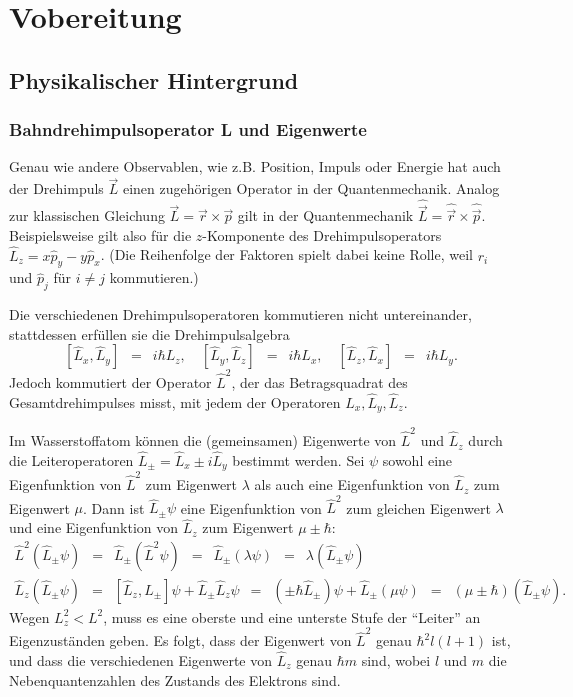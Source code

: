 \documentclass{article}
\newcommand{\widespace}{\enspace}
\newcommand{\wideeq}{\widespace = \widespace}
\begin{document}
\newpage


\section{Vobereitung}

\subsection{Physikalischer Hintergrund}

\subsubsection{Bahndrehimpulsoperator L und Eigenwerte}

Genau wie andere Observablen, wie z.B. Position, Impuls oder Energie hat auch der
Drehimpuls $\vec L$ einen zugehörigen Operator in der Quantenmechanik.
Analog zur klassischen Gleichung $\vec L = \vec r \times \vec p$
gilt in der Quantenmechanik $\hat{\vec L} = \hat{\vec r} \times \hat{\vec p}$.
Beispielsweise gilt also für die $z$-Komponente des Drehimpulsoperators
$\hat L_z = x \hat p_y - y \hat p_x$.
(Die Reihenfolge der Faktoren spielt dabei keine Rolle,
weil $r_i$ und $\hat p_j$ für $i \neq j$ kommutieren.)

Die verschiedenen Drehimpulsoperatoren kommutieren nicht untereinander,
stattdessen erfüllen sie die Drehimpulsalgebra
\[
    [\hat L_x, \hat L_y] \wideeq i \hbar L_z, \quad
    [\hat L_y, \hat L_z] \wideeq i \hbar L_x, \quad
    [\hat L_z, \hat L_x] \wideeq i \hbar L_y.
\]
Jedoch kommutiert der Operator $\hat L^2$, der das Betragsquadrat des
Gesamtdrehimpulses misst, mit jedem der Operatoren $\hat L_x, \hat L_y, \hat L_z$.

Im Wasserstoffatom können die (gemeinsamen) Eigenwerte von $\hat L^2$ und $\hat L_z$
durch die Leiteroperatoren $\hat L_{\pm} = \hat L_x \pm i \hat L_y$ bestimmt
werden. Sei $\psi$ sowohl eine Eigenfunktion von $\hat L^2$ zum Eigenwert $\lambda$
als auch eine Eigenfunktion von $\hat L_z$ zum Eigenwert $\mu$.
Dann ist $\hat L_\pm \psi$ eine Eigenfunktion von $\hat L^2$ zum gleichen Eigenwert
$\lambda$ und eine Eigenfunktion von $\hat L_z$ zum Eigenwert $\mu \pm \hbar$:
\begin{gather*}
    \hat L^2 (\hat L_\pm \psi) \wideeq \hat L_\pm (\hat L^2 \psi)
    \wideeq \hat L_\pm (\lambda \psi) \wideeq \lambda (\hat L_\pm \psi) \\
    \hat L_z (\hat L_\pm \psi) \wideeq [\hat L_z, L_\pm] \psi
    + \hat L_\pm \hat L_z \psi
    \wideeq (\pm \hbar \hat L_\pm) \psi + \hat L_\pm (\mu \psi)
    \wideeq (\mu \pm \hbar) (\hat L_\pm \psi).
\end{gather*}
Wegen $L_z^2 < L^2$, muss es eine oberste und eine unterste Stufe der ``Leiter''
an Eigenzuständen geben. Es folgt, dass der Eigenwert von $\hat L^2$ genau
$\hbar^2 l (l + 1)$ ist, und dass die verschiedenen Eigenwerte von $\hat L_z$
genau $\hbar m$ sind, wobei $l$ und $m$ die Nebenquantenzahlen des Zustands des
Elektrons sind.
\end{document}
